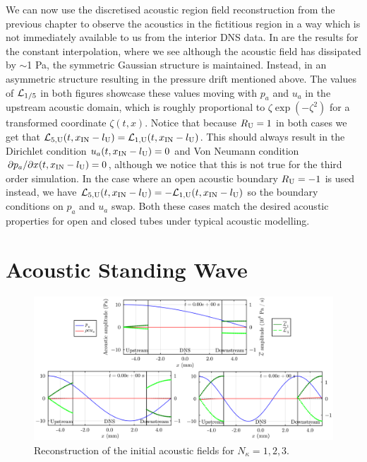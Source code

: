 We can now use the discretised acoustic region field reconstruction from the previous chapter to observe the acoustics in the fictitious region in a way which is not immediately available to us from the interior DNS data. In  are the results for the constant interpolation, where we see although the acoustic field has dissipated by $\sim$1 Pa, the symmetric Gaussian structure is maintained. Instead, in  an asymmetric structure resulting in the pressure drift mentioned above. The values of $\cl{L}_{1/5}$ in both figures showcase these values moving with $p_a$ and $u_a$ in the upstream acoustic domain, which is roughly proportional to $ζ \exp(-ζ^2)$ for a transformed coordinate $ζ(t, x)$. Notice that because $R_{\rm{U}} = 1$ in both cases we get that $\cl{L}_{5, \rm{U}}(t, x_{\rm{IN}} - l_{\rm{U}}) = \cl{L}_{1, \rm{U}}(t, x_{\rm{IN}} - l_{\rm{U}})$. This should always result in the Dirichlet condition $u_a(t, x_{\rm{IN}} - l_{\rm{U}}) = 0$ and Von Neumann condition $\partial p_a / \partial x(t, x_{\rm{IN}} - l_{\rm{U}}) = 0$, although we notice that this is not true for the third order simulation. In the case where an open acoustic boundary $R_{\rm{U}} = -1$ is used instead, we have $\cl{L}_{5, \rm{U}}(t, x_{\rm{IN}} - l_{\rm{U}}) = -\cl{L}_{1, \rm{U}}(t, x_{\rm{IN}} - l_{\rm{U}})$ so the boundary conditions on $p_a$ and $u_a$ swap. Both these cases match the desired acoustic properties for open and closed tubes under typical acoustic modelling.




\section{Acoustic Standing Wave}

\begin{figure}[t]
\centering
\includegraphics[scale=0.30]{assets/graphs/ac-plot-wave-modes.pdf}
\caption{Reconstruction of the initial acoustic fields for $N_κ = 1, 2, 3$.}
\label{fig:ac-wave-modes}
\end{figure}

